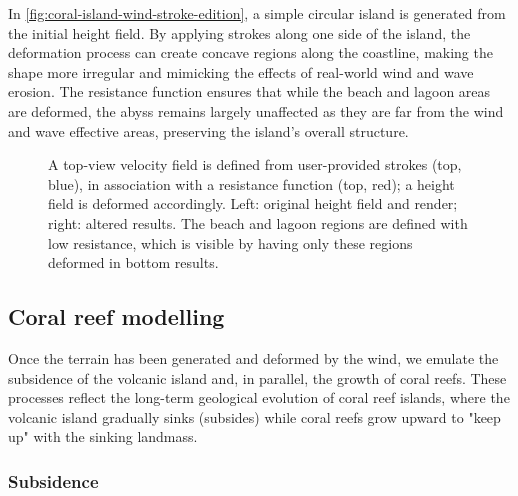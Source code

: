 In \cref{fig:coral-island-wind-stroke-edition}, a simple circular island is generated from the initial height field. By applying strokes along one side of the island, the deformation process can create concave regions along the coastline, making the shape more irregular and mimicking the effects of real-world wind and wave erosion. The resistance function ensures that while the beach and lagoon areas are deformed, the abyss remains largely unaffected as they are far from the wind and wave effective areas, preserving the island's overall structure.

\begin{figure}
    \caption{A top-view velocity field is defined from user-provided strokes (top, blue), in association with a resistance function (top, red); a height field is deformed accordingly. Left: original height field and render; right: altered results. The beach and lagoon regions are defined with low resistance, which is visible by having only these regions deformed in bottom results.}
    \label{fig:coral-island-wind-effect-result}
\end{figure}

\subsection{Coral reef modelling}
\label{sec:coral-island-coral-reef}

Once the terrain has been generated and deformed by the wind, we emulate the subsidence of the volcanic island and, in parallel, the growth of coral reefs. These processes reflect the long-term geological evolution of coral reef islands, where the volcanic island gradually sinks (subsides) while coral reefs grow upward to "keep up" with the sinking landmass.

\subsubsection{Subsidence}
\label{sec:coral-island-subsidence}

